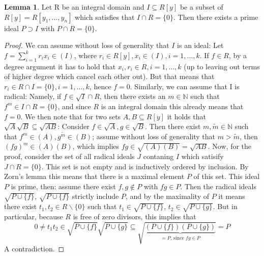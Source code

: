 \documentclass{article}
\def\N{\mathbb{N}}
\theoremstyle{definition}
\newtheorem{lem}[Satz]{Lemma}
\begin{document}
\begin{lem}\label{primeoverp1}
Let R be an integral domain and $I \subseteq R[y]$ be a subset of $R[y] = R[y_1,\ldots,y_n]$ which satisfies that $I \cap R = \{ 0 \}$.
Then there exists a prime ideal $P \supset I$ with $P \cap R = \{0\}$.
\begin{proof}
We can assume without loss of generality that $I$ is an ideal: Let $f = \sum_{i=1}^kr_i x_i \in (I)$, where $r_i \in R[y], x_i \in (I), i = 1,\ldots,k$. If $f \in R$, by a degree argument it has to hold that $x_i, r_i \in R, i=1,\ldots,k$
(up to leaving out terms of higher degree which cancel each other out).
But that means that $r_i \in R \cap I = \{0\}, i=1,\ldots,k$, hence $f = 0$. Similarly, we can assume that I is radical:
Namely, if $f \in \sqrt{I} \cap R$, then there exists an $m \in \N$ such that $f^m \in I \cap R = \{0\}$, and since $R$ is an integral domain this already means that $f = 0$.
We then note that for two sets $A,B \subseteq R[y]$ it holds that $\sqrt{A}\sqrt{B} \subseteq \sqrt{AB}$: Consider $f \in \sqrt{A}, g \in \sqrt{B}$. Then there exist $m, \tilde m \in \N$ such that $f^m \in (A), g^{\tilde m} \in (B)$;
 assume without loss of generality that $m > \tilde m$, then $(fg)^m \in (A)(B)$, which implies $fg \in \sqrt{(A)(B)} = \sqrt{AB}$.
Now, for the proof, consider the set of all radical ideals $J$ contaning $I$ which satisify $J \cap R = \{0\}$. This set is not empty and is inductively ordered by inclusion.
By Zorn's lemma this means that there is a maximal element $P$ of this set. This ideal $P$ is prime, then: assume there exist $f,g \notin P$ with $fg \in P$. 
Then the radical ideals $\sqrt{P \cup \{f\}}$, $\sqrt{P \cup \{f\}}$ strictly include $P$, and by the maximality of $P$ it means there exist $t_1, t_2 \in R\backslash\{0\}$ such that
$t_1 \in \sqrt{P \cup \{f\}}$, $t_2 \in \sqrt{P \cup \{g\}}$. But in particular, because $R$ is free of zero divisors, this implies that
 \[0 \neq t_1t_2 \in \sqrt{P \cup \{f\}}\sqrt{P \cup \{g\}} \subseteq \sqrt{ \underbrace{(P \cup \{f\})(P \cup \{g\})}_{=P\text{, since }fg \in P}} = P\]
A contradiction.
\end{proof}
\end{lem}
\end{document}
